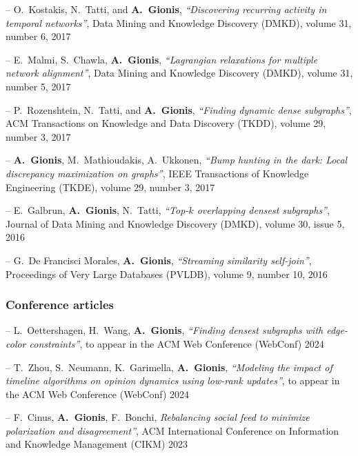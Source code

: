 \documentclass[a4paper,11pt]{article}
\begin{document}
\item[--]
{O.\ Kostakis, N.\ Tatti, and \textbf{A.\ Gionis}}, 
{\em ``Discovering recurring activity in temporal networks''},
Data Mining and Knowledge Discovery (DMKD),
volume 31, number 6, 2017

\item[--]
{E.\ Malmi, S.\ Chawla, \textbf{A.\ Gionis}}, 
{\em ``Lagrangian relaxations for multiple network alignment''},
Data Mining and Knowledge Discovery (DMKD),
volume 31, number 5, 2017

\item[--]
{P.\ Rozenshtein, N.\ Tatti, and \textbf{A.\ Gionis}}, 
{\em ``Finding dynamic dense subgraphs''}, 
ACM Transactions on Knowledge and Data Discovery (TKDD), volume 29, number 3, 2017

\item[--]
{\textbf{A.\ Gionis}, M.\ Mathioudakis, A.\ Ukkonen}, 
{\em ``Bump hunting in the dark: Local discrepancy maximization on graphs''}, 
IEEE Transactions of Knowledge Engineering (TKDE), volume 29, number 3, 2017

\item[--]
{E.\ Galbrun, \textbf{A.\ Gionis}, N.\ Tatti}, 
{\em ``Top-$k$ overlapping densest subgraphs''}, 
Journal of Data Mining and Knowledge Discovery (DMKD), volume 30, issue 5, 2016

\item[--]
{G.\ De Francisci Morales, \textbf{A.\ Gionis}}, 
{\em ``Streaming similarity self-join''}, 
Proceedings of Very Large Databases (PVLDB), volume 9, number 10, 2016

\biblistend


\subsubsection*{Conference articles}

\biblist

\item[--]
{L.\ Oettershagen, H.\ Wang, \textbf{A.\ Gionis}},
{\em ``Finding densest subgraphs with edge-color constraints''},
to appear in the ACM Web Conference (WebConf) 2024

\item[--]
{T.\ Zhou, S.\ Neumann, K.\ Garimella, \textbf{A.\ Gionis}},
{\em ``Modeling the impact of timeline algorithms on opinion dynamics using low-rank updates''},
to appear in the ACM Web Conference (WebConf) 2024

\item[--]
{F.\ Cinus, \textbf{A.\ Gionis}, F.\ Bonchi},
{\em Rebalancing social feed to minimize polarization and disagreement''}, 
ACM International Conference on Information and Knowledge Management (CIKM) 2023
\end{document}
